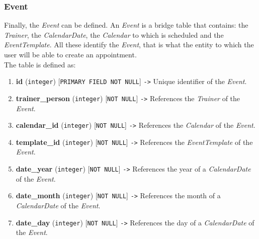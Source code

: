 \documentclass[a4paper, 12pt, oneside]{book}
\begin{document}
\subsubsection{Event}
Finally, the \emph{Event} can be defined. An \emph{Event} is a bridge table that contains: the \emph{Trainer}, the \emph{CalendarDate}, the \emph{Calendar} to which is scheduled and the \emph{EventTemplate}. All these identify the \emph{Event}, that is what the entity to which the user will be able to create an appointment.
\\[8pt]
The table is defined as:
\begin{enumerate}[label = -]
	\item \textbf{id} (\texttt{integer}) [\texttt{PRIMARY FIELD NOT NULL}] \texttt{->} Unique identifier of the \emph{Event}.
	\item \textbf{trainer\_person} (\texttt{integer}) [\texttt{NOT NULL}] \texttt{->} References the \emph{Trainer} of the \emph{Event}.
	\item \textbf{calendar\_id} (\texttt{integer}) [\texttt{NOT NULL}] \texttt{->} References the \emph{Calendar} of the \emph{Event}.
	\item \textbf{template\_id} (\texttt{integer}) [\texttt{NOT NULL}] \texttt{->} References the \emph{EventTemplate} of the \emph{Event}.
	\item \textbf{date\_year} (\texttt{integer}) [\texttt{NOT NULL}] \texttt{->} References the year of a \emph{CalendarDate} of the \emph{Event}.
	\item \textbf{date\_month} (\texttt{integer}) [\texttt{NOT NULL}] \texttt{->} References the month of a \emph{CalendarDate} of the \emph{Event}.
	\item \textbf{date\_day} (\texttt{integer}) [\texttt{NOT NULL}] \texttt{->} References the day of a \emph{CalendarDate} of the \emph{Event}.
\end{enumerate}
\end{document}
